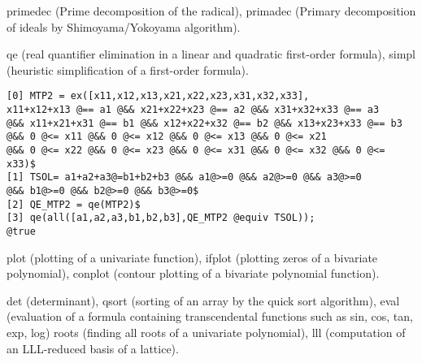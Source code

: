 \documentclass[twocolumn]{article}
\begin{document}
\medbreak
\noindent
{} 

\noindent
{\color{red} primedec} (Prime decomposition of the radical),
{\color{red} primadec} (Primary decomposition of ideals by Shimoyama/Yokoyama algorithm).

\medbreak

\noindent
{} 

\noindent
{\color{red} qe} (real quantifier elimination in a linear and 
quadratic first-order formula),
{\color{red} simpl} (heuristic simplification of a first-order formula).

{\scriptsize
\begin{verbatim}
[0] MTP2 = ex([x11,x12,x13,x21,x22,x23,x31,x32,x33],
x11+x12+x13 @== a1 @&& x21+x22+x23 @== a2 @&& x31+x32+x33 @== a3 
@&& x11+x21+x31 @== b1 @&& x12+x22+x32 @== b2 @&& x13+x23+x33 @== b3
@&& 0 @<= x11 @&& 0 @<= x12 @&& 0 @<= x13 @&& 0 @<= x21
@&& 0 @<= x22 @&& 0 @<= x23 @&& 0 @<= x31 @&& 0 @<= x32 @&& 0 @<= x33)$
[1] TSOL= a1+a2+a3@=b1+b2+b3 @&& a1@>=0 @&& a2@>=0 @&& a3@>=0
@&& b1@>=0 @&& b2@>=0 @&& b3@>=0$
[2] QE_MTP2 = qe(MTP2)$
[3] qe(all([a1,a2,a3,b1,b2,b3],QE_MTP2 @equiv TSOL));
@true
\end{verbatim}}
\medbreak

\noindent
{} 

\noindent
{\color{red} plot} (plotting of a univariate function),
{\color{red} ifplot} (plotting zeros of a bivariate polynomial),
{\color{red} conplot} (contour plotting of a bivariate polynomial function).

\medbreak

\noindent
{} 

\noindent
{\color{red} det} (determinant),
{\color{red} qsort} (sorting of an array by the quick sort algorithm),
{\color{red} eval} (evaluation of a formula containing transcendental functions
such as 
{\color{red} sin}, {\color{red} cos}, {\color{red} tan}, {\color{red} exp},
{\color{red} log})
{\color{red} roots} (finding all roots of a univariate polynomial),
{\color{red} lll} (computation of an LLL-reduced basis of a lattice).

\medbreak
\vfill
\noindent
\rightline{ {\color{red} {\tt http://www.openxm.org} }}
\end{document}
